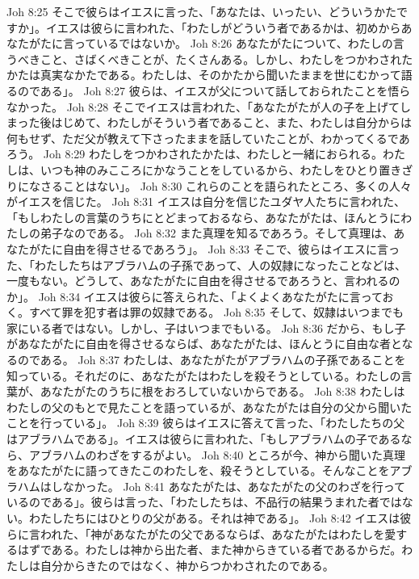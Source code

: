 Joh 8:25  そこで彼らはイエスに言った、「あなたは、いったい、どういうかたですか」。イエスは彼らに言われた、「わたしがどういう者であるかは、初めからあなたがたに言っているではないか。
Joh 8:26  あなたがたについて、わたしの言うべきこと、さばくべきことが、たくさんある。しかし、わたしをつかわされたかたは真実なかたである。わたしは、そのかたから聞いたままを世にむかって語るのである」。
Joh 8:27  彼らは、イエスが父について話しておられたことを悟らなかった。
Joh 8:28  そこでイエスは言われた、「あなたがたが人の子を上げてしまった後はじめて、わたしがそういう者であること、また、わたしは自分からは何もせず、ただ父が教えて下さったままを話していたことが、わかってくるであろう。
Joh 8:29  わたしをつかわされたかたは、わたしと一緒におられる。わたしは、いつも神のみこころにかなうことをしているから、わたしをひとり置きざりになさることはない」。
Joh 8:30  これらのことを語られたところ、多くの人々がイエスを信じた。
Joh 8:31  イエスは自分を信じたユダヤ人たちに言われた、「もしわたしの言葉のうちにとどまっておるなら、あなたがたは、ほんとうにわたしの弟子なのである。
Joh 8:32  また真理を知るであろう。そして真理は、あなたがたに自由を得させるであろう」。
Joh 8:33  そこで、彼らはイエスに言った、「わたしたちはアブラハムの子孫であって、人の奴隷になったことなどは、一度もない。どうして、あなたがたに自由を得させるであろうと、言われるのか」。
Joh 8:34  イエスは彼らに答えられた、「よくよくあなたがたに言っておく。すべて罪を犯す者は罪の奴隷である。
Joh 8:35  そして、奴隷はいつまでも家にいる者ではない。しかし、子はいつまでもいる。
Joh 8:36  だから、もし子があなたがたに自由を得させるならば、あなたがたは、ほんとうに自由な者となるのである。
Joh 8:37  わたしは、あなたがたがアブラハムの子孫であることを知っている。それだのに、あなたがたはわたしを殺そうとしている。わたしの言葉が、あなたがたのうちに根をおろしていないからである。
Joh 8:38  わたしはわたしの父のもとで見たことを語っているが、あなたがたは自分の父から聞いたことを行っている」。
Joh 8:39  彼らはイエスに答えて言った、「わたしたちの父はアブラハムである」。イエスは彼らに言われた、「もしアブラハムの子であるなら、アブラハムのわざをするがよい。
Joh 8:40  ところが今、神から聞いた真理をあなたがたに語ってきたこのわたしを、殺そうとしている。そんなことをアブラハムはしなかった。
Joh 8:41  あなたがたは、あなたがたの父のわざを行っているのである」。彼らは言った、「わたしたちは、不品行の結果うまれた者ではない。わたしたちにはひとりの父がある。それは神である」。
Joh 8:42  イエスは彼らに言われた、「神があなたがたの父であるならば、あなたがたはわたしを愛するはずである。わたしは神から出た者、また神からきている者であるからだ。わたしは自分からきたのではなく、神からつかわされたのである。
